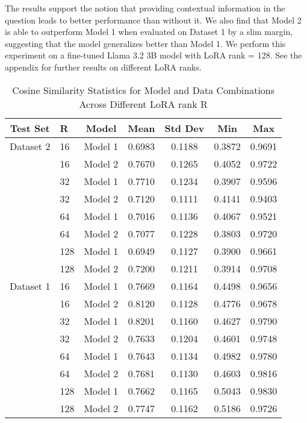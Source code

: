 The results support the notion that providing contextual information in the question leads to better performance than without it.
We also find that Model 2 is able to outperform Model 1 when evaluated on Dataset 1 by a slim margin,
suggesting that the model generalizes better than Model 1. We perform this experiment on a fine-tuned Llama 3.2 3B model with
LoRA rank = 128. See the appendix for further results on different LoRA ranks.

\begin{table}[h!]
    \centering
    \caption{Cosine Similarity Statistics for Model and Data Combinations Across Different LoRA rank R}
    \label{tab:cosine_similarity_context_sizes}
    \begin{tabular}{clccccc}
    \toprule
    \textbf{Test Set} & \textbf{R} & \textbf{Model} & \textbf{Mean} & \textbf{Std Dev} & \textbf{Min} & \textbf{Max} \\
    \midrule
    \centering Dataset 2 & 16  & Model 1 & 0.6983 & 0.1188 & 0.3872 & 0.9691 \\
    & 16  & Model 2 & 0.7670 & 0.1265 & 0.4052 & 0.9722 \\
    \addlinespace[0.5em]
    & 32  & Model 1 & 0.7710 & 0.1234 & 0.3907 & 0.9596 \\
    & 32  & Model 2 & 0.7120 & 0.1111 & 0.4141 & 0.9403 \\
    \addlinespace[0.5em]
    & 64  & Model 1 & 0.7016 & 0.1136 & 0.4067 & 0.9521 \\
    & 64  & Model 2 & 0.7077 & 0.1228 & 0.3803 & 0.9720 \\
    \addlinespace[0.5em]
    & 128 & Model 1 & 0.6949 & 0.1127 & 0.3900 & 0.9661 \\
    & 128 & Model 2 & 0.7200 & 0.1211 & 0.3914 & 0.9708 \\
    \midrule
    \centering Dataset 1 & 16  & Model 1 & 0.7669 & 0.1164 & 0.4498 & 0.9656 \\
    & 16  & Model 2 & 0.8120 & 0.1128 & 0.4776 & 0.9678 \\
    \addlinespace[0.5em]
    & 32  & Model 1 & 0.8201 & 0.1160 & 0.4627 & 0.9790 \\
    & 32  & Model 2 & 0.7633 & 0.1204 & 0.4601 & 0.9748 \\
    \addlinespace[0.5em]
    & 64  & Model 1 & 0.7643 & 0.1134 & 0.4982 & 0.9780 \\
    & 64  & Model 2 & 0.7681 & 0.1130 & 0.4603 & 0.9816 \\
    \addlinespace[0.5em]
    & 128 & Model 1 & 0.7662 & 0.1165 & 0.5043 & 0.9830 \\
    & 128 & Model 2 & 0.7747 & 0.1162 & 0.5186 & 0.9726 \\
    \bottomrule
    \end{tabular}
\end{table}
